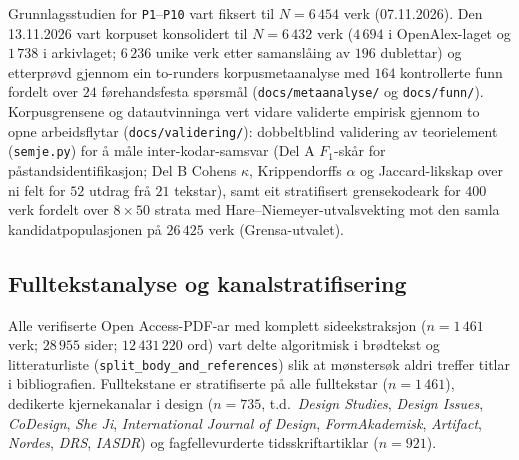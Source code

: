 \documentclass[11pt,a4paper]{article}
\begin{document}
Grunnlagsstudien for \texttt{P1}--\texttt{P10} vart fiksert til $N = 6\,454$ verk (07.11.2026). Den 13.11.2026 vart korpuset konsolidert til $N = 6\,432$ verk ($4\,694$ i OpenAlex-laget og $1\,738$ i arkivlaget; $6\,236$ unike verk etter samanslåing av $196$ dublettar) og etterprøvd gjennom ein to-runders korpusmetaanalyse med $164$ kontrollerte funn fordelt over $24$ førehandsfesta spørsmål (\texttt{docs/metaanalyse/} og \texttt{docs/funn/}). Korpusgrensene og datautvinninga vert vidare validerte empirisk gjennom to opne arbeidsflytar (\texttt{docs/validering/}): dobbeltblind validering av teorielement (\texttt{semje.py}) for å måle inter-kodar-samsvar (Del A $F_1$-skår for påstandsidentifikasjon; Del B Cohens $\kappa$, Krippendorffs $\alpha$ og Jaccard-likskap over ni felt for $52$ utdrag frå $21$ tekstar), samt eit stratifisert grensekodeark for $400$ verk fordelt over $8 \times 50$ strata med Hare--Niemeyer-utvalsvekting mot den samla kandidatpopulasjonen på $26\,425$ verk (Grensa-utvalet).

\subsection{Fulltekstanalyse og kanalstratifisering}
Alle verifiserte Open Access-PDF-ar med komplett sideekstraksjon ($n = 1\,461$ verk; $28\,955$ sider; $12\,431\,220$ ord) vart delte algoritmisk i brødtekst og litteraturliste (\texttt{split\_body\_and\_references}) slik at mønstersøk aldri treffer titlar i bibliografien. Fulltekstane er stratifiserte på alle fulltekstar ($n = 1\,461$), dedikerte kjernekanalar i design ($n = 735$, t.d.\ \emph{Design Studies}, \emph{Design Issues}, \emph{CoDesign}, \emph{She Ji}, \emph{International Journal of Design}, \emph{FormAkademisk}, \emph{Artifact}, \emph{Nordes}, \emph{DRS}, \emph{IASDR}) og fagfellevurderte tidsskriftartiklar ($n = 921$).
\end{document}
